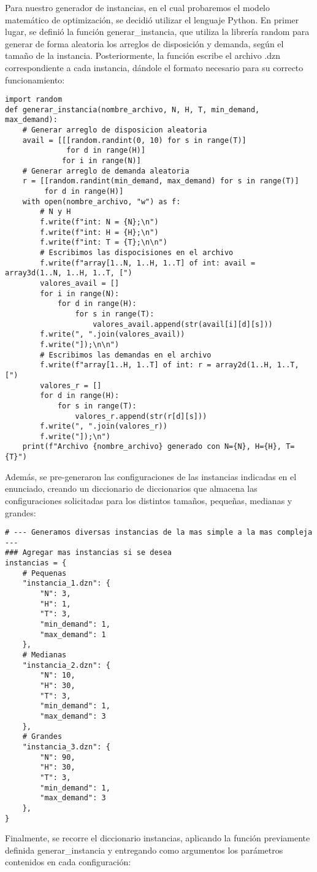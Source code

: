 Para nuestro generador de instancias, en el cual probaremos el modelo matemático de optimización, se decidió utilizar el lenguaje Python. En primer lugar, se definió la función generar\_instancia, que utiliza la librería random para generar de forma aleatoria los arreglos de disposición y demanda, según el tamaño de la instancia. Posteriormente, la función escribe el archivo .dzn correspondiente a cada instancia, dándole el formato necesario para su correcto funcionamiento:

\begin{lstlisting}[]
import random
def generar_instancia(nombre_archivo, N, H, T, min_demand, max_demand):
    # Generar arreglo de disposicion aleatoria
    avail = [[[random.randint(0, 10) for s in range(T)] 
              for d in range(H)] 
             for i in range(N)]
    # Generar arreglo de demanda aleatoria
    r = [[random.randint(min_demand, max_demand) for s in range(T)] 
         for d in range(H)]
    with open(nombre_archivo, "w") as f:
        # N y H
        f.write(f"int: N = {N};\n")
        f.write(f"int: H = {H};\n")
        f.write(f"int: T = {T};\n\n")
        # Escribimos las dispocisiones en el archivo
        f.write(f"array[1..N, 1..H, 1..T] of int: avail = array3d(1..N, 1..H, 1..T, [")
        valores_avail = []
        for i in range(N):
            for d in range(H):
                for s in range(T):
                    valores_avail.append(str(avail[i][d][s]))
        f.write(", ".join(valores_avail))
        f.write("]);\n\n")
        # Escribimos las demandas en el archivo
        f.write(f"array[1..H, 1..T] of int: r = array2d(1..H, 1..T, [")
        valores_r = []
        for d in range(H):
            for s in range(T):
                valores_r.append(str(r[d][s]))
        f.write(", ".join(valores_r))
        f.write("]);\n")
    print(f"Archivo {nombre_archivo} generado con N={N}, H={H}, T={T}")
\end{lstlisting}
Además, se pre-generaron las configuraciones de las instancias indicadas en el enunciado, creando un diccionario de diccionarios que almacena las configuraciones solicitadas para los distintos tamaños, pequeñas, medianas y grandes:

\begin{lstlisting}[]
# --- Generamos diversas instancias de la mas simple a la mas compleja ---
### Agregar mas instancias si se desea
instancias = {
    # Pequenas
    "instancia_1.dzn": {
        "N": 3,
        "H": 1,
        "T": 3,
        "min_demand": 1,
        "max_demand": 1
    },
    # Medianas
    "instancia_2.dzn": {
        "N": 10,
        "H": 30,
        "T": 3,
        "min_demand": 1,
        "max_demand": 3
    },
    # Grandes
    "instancia_3.dzn": {
        "N": 90,
        "H": 30,
        "T": 3,
        "min_demand": 1,
        "max_demand": 3
    },
}
\end{lstlisting}
Finalmente, se recorre el diccionario instancias, aplicando la función previamente definida generar\_instancia y entregando como argumentos los parámetros contenidos en cada configuración:

